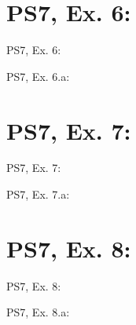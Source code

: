 \section{PS7, Ex. 6: }

\begin{frame}{PS7, Ex. 6: }
  \begin{multicols}{2}
    \vfill\null\columnbreak
    \vfill
  \end{multicols}
\end{frame}

\begin{frame}{PS7, Ex. 6.a: }
  \begin{multicols}{2}
    \vfill\null\columnbreak
    \vfill
  \end{multicols}
\end{frame}



\section{PS7, Ex. 7: }

\begin{frame}{PS7, Ex. 7: }
  \begin{multicols}{2}
    \vfill\null\columnbreak
    \vfill
  \end{multicols}
\end{frame}

\begin{frame}{PS7, Ex. 7.a: }
  \begin{multicols}{2}
    \vfill\null\columnbreak
    \vfill
  \end{multicols}
\end{frame}



\section{PS7, Ex. 8: }

\begin{frame}{PS7, Ex. 8: }
  \begin{multicols}{2}
    \vfill\null\columnbreak
    \vfill
  \end{multicols}
\end{frame}

\begin{frame}{PS7, Ex. 8.a: }
  \begin{multicols}{2}
    \vfill\null\columnbreak
    \vfill
  \end{multicols}
\end{frame}



